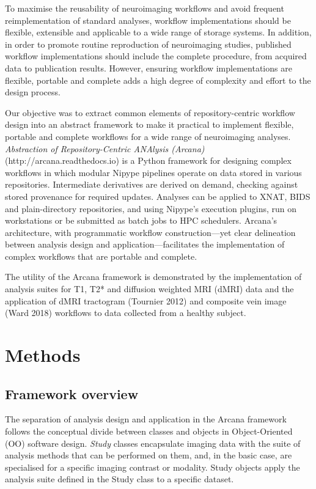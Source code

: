 To maximise the reusability of neuroimaging workflows and avoid frequent
reimplementation of standard analyses, workflow implementations should
be flexible, extensible and applicable to a wide range of storage
systems. In addition, in order to promote routine reproduction of
neuroimaging studies, published workflow implementations should include
the complete procedure, from acquired data to publication results.
However, ensuring workflow implementations are flexible, portable and
complete adds a high degree of complexity and effort to the design
process.

Our objective was to extract common elements of repository-centric
workflow design into an abstract framework to make it practical to
implement flexible, portable and complete workflows for a wide range of
neuroimaging analyses. \emph{Abstraction of Repository-Centric ANAlysis
(Arcana)} (http://arcana.readthedocs.io) is a Python framework for
designing complex workflows in which modular Nipype pipelines operate on
data stored in various repositories. Intermediate derivatives are
derived on demand, checking against stored provenance for required
updates. Analyses can be applied to XNAT, BIDS and plain-directory
repositories, and using Nipype's execution plugins, run on workstations
or be submitted as batch jobs to HPC schedulers. Arcana's architecture,
with programmatic workflow construction---yet clear delineation between
analysis design and application---facilitates the implementation of
complex workflows that are portable and complete.

The utility of the Arcana framework is demonstrated by the
implementation of analysis suites for T1, T2* and diffusion weighted MRI
(dMRI) data and the application of dMRI tractogram (Tournier 2012) and
composite vein image (Ward 2018) workflows to data collected from a
healthy subject.

\hypertarget{methods}{%
\section{Methods}\label{methods}}

\hypertarget{framework-overview}{%
\subsection{Framework overview}\label{framework-overview}}

The separation of analysis design and application in the Arcana
framework follows the conceptual divide between classes and objects in
Object-Oriented (OO) software design. \emph{Study} classes encapsulate
imaging data with the suite of analysis methods that can be performed on
them, and, in the basic case, are specialised for a specific imaging
contrast or modality. Study objects apply the analysis suite defined in
the Study class to a specific dataset.

